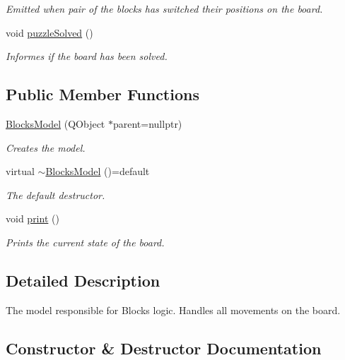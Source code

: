 \begin{DoxyCompactItemize}
\begin{DoxyCompactList}\small\item\em Emitted when pair of the blocks has switched their positions on the board. \end{DoxyCompactList}\item 
void \mbox{\hyperlink{class_blocks_model_a0511c008064fa694adfc249c096609bb}{puzzle\+Solved}} ()
\begin{DoxyCompactList}\small\item\em Informes if the board has been solved. \end{DoxyCompactList}\end{DoxyCompactItemize}
\subsection*{Public Member Functions}
\begin{DoxyCompactItemize}
\item 
\mbox{\hyperlink{class_blocks_model_a0c3da3595fe9984f7ac2c02cef09c03d}{Blocks\+Model}} (Q\+Object $\ast$parent=nullptr)
\begin{DoxyCompactList}\small\item\em Creates the model. \end{DoxyCompactList}\item 
virtual \mbox{\hyperlink{class_blocks_model_af39495843287a69e0957451f3751ebbe}{$\sim$\+Blocks\+Model}} ()=default
\begin{DoxyCompactList}\small\item\em The default destructor. \end{DoxyCompactList}\item 
void \mbox{\hyperlink{class_blocks_model_a115cbe7c4e49a128ebcbae3b5c6c24ee}{print}} ()
\begin{DoxyCompactList}\small\item\em Prints the current state of the board. \end{DoxyCompactList}\end{DoxyCompactItemize}


\subsection{Detailed Description}
The model responsible for Blocks logic. Handles all movements on the board. 



\subsection{Constructor \& Destructor Documentation}
\mbox{\label{class_blocks_model_a0c3da3595fe9984f7ac2c02cef09c03d}} 
